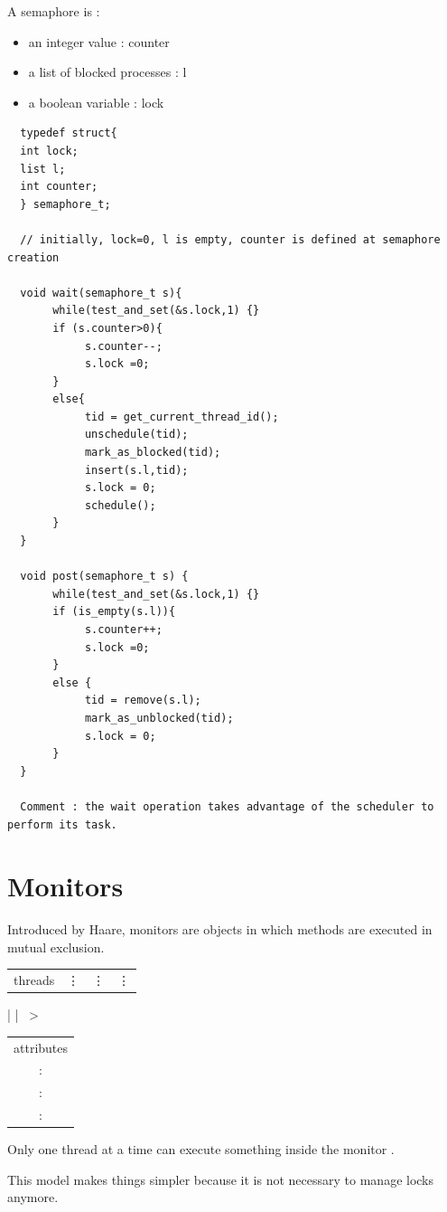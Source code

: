 A semaphore is :
\begin{itemize}
  \item an integer value : counter
  \item a list of blocked processes : l
  \item a boolean variable : lock
\end{itemize}
\begin{verbatim}
  typedef struct{
  int lock;
  list l;
  int counter;
  } semaphore_t;
  
  // initially, lock=0, l is empty, counter is defined at semaphore creation
  
  void wait(semaphore_t s){
       while(test_and_set(&s.lock,1) {}
       if (s.counter>0){
            s.counter--;
            s.lock =0;
       }
       else{
            tid = get_current_thread_id();
            unschedule(tid);
            mark_as_blocked(tid);
            insert(s.l,tid);
            s.lock = 0;
            schedule();
       }
  }
  
  void post(semaphore_t s) {
       while(test_and_set(&s.lock,1) {}
       if (is_empty(s.l)){
            s.counter++;
            s.lock =0;   
       }
       else {
            tid = remove(s.l);
            mark_as_unblocked(tid);
            s.lock = 0;
       }
  }
  
  Comment : the wait operation takes advantage of the scheduler to perform its task.
\end{verbatim}

\section{Monitors}

Introduced by Haare, monitors are objects in which methods are executed in mutual exclusion.

\begin{tabular}{cccc}
  threads & \vdots & \vdots & \vdots
\end{tabular}
|
| 
\textgreater
\begin{tabular}{|c|}
 attributes \\
 : \\
 : \\
 : \\
\end{tabular}

Only one thread at a time can execute something inside the monitor .

This model makes things simpler because it is not necessary to manage locks anymore.

